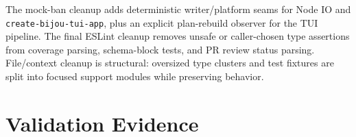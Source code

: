 The mock-ban cleanup adds deterministic writer/platform seams for Node IO and \texttt{c\allowbreak{}r\allowbreak{}e\allowbreak{}a\allowbreak{}t\allowbreak{}e\allowbreak{}-\allowbreak{}b\allowbreak{}i\allowbreak{}j\allowbreak{}o\allowbreak{}u\allowbreak{}-\allowbreak{}t\allowbreak{}u\allowbreak{}i\allowbreak{}-\allowbreak{}a\allowbreak{}p\allowbreak{}p}, plus an explicit plan-rebuild observer for the TUI pipeline. The final ESLint cleanup removes unsafe or caller-chosen type assertions from coverage parsing, schema-block tests, and PR review status parsing. File/context cleanup is structural: oversized type clusters and test fixtures are split into focused support modules while preserving behavior.

\section{Validation Evidence}\label{record-242-validation-evidence}

